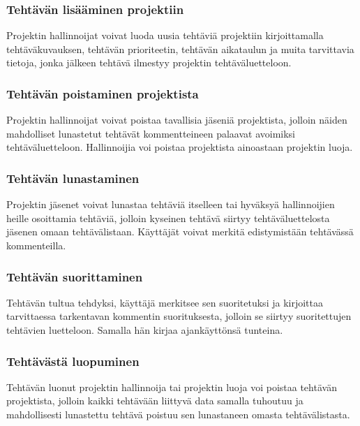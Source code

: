 \documentclass[12pt,a4paper]{article}
\begin{document}
\subsubsection*{Tehtävän lisääminen projektiin}
Projektin hallinnoijat voivat luoda uusia tehtäviä projektiin kirjoittamalla tehtäväkuvauksen, tehtävän
prioriteetin, tehtävän aikataulun ja muita tarvittavia tietoja, jonka jälkeen tehtävä ilmestyy projektin
tehtäväluetteloon.

\subsubsection*{Tehtävän poistaminen projektista}
Projektin hallinnoijat voivat poistaa tavallisia jäseniä projektista, jolloin näiden mahdolliset lunastetut
tehtävät kommentteineen palaavat avoimiksi tehtäväluetteloon. Hallinnoijia voi poistaa projektista
ainoastaan projektin luoja.

\subsubsection*{Tehtävän lunastaminen}
Projektin jäsenet voivat lunastaa tehtäviä itselleen tai hyväksyä hallinnoijien heille osoittamia
tehtäviä, jolloin kyseinen tehtävä siirtyy tehtäväluettelosta jäsenen omaan tehtävälistaan. Käyttäjät voivat
merkitä edistymistään tehtävässä kommenteilla.

\subsubsection*{Tehtävän suorittaminen}
Tehtävän tultua tehdyksi, käyttäjä merkitsee sen suoritetuksi ja kirjoittaa tarvittaessa tarkentavan
kommentin suorituksesta, jolloin se siirtyy suoritettujen tehtävien luetteloon. Samalla hän kirjaa
ajankäyttönsä tunteina.

\subsubsection*{Tehtävästä luopuminen}
Tehtävän luonut projektin hallinnoija tai projektin luoja voi poistaa tehtävän projektista, jolloin
kaikki tehtävään liittyvä data samalla tuhoutuu ja mahdollisesti lunastettu tehtävä poistuu sen
lunastaneen omasta tehtävälistasta.
\end{document}
